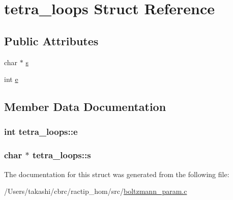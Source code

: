 \hypertarget{structtetra__loops}{\section{tetra\+\_\+loops Struct Reference}
\label{structtetra__loops}
}
\subsection*{Public Attributes}
\begin{DoxyCompactItemize}
\item 
char $\ast$ \hyperlink{structtetra__loops_a5a9ff926aa7eda504b3f011c3eeefe84}{s}
\item 
int \hyperlink{structtetra__loops_a5ab6b25e9a5fd07b656290030ed51da5}{e}
\end{DoxyCompactItemize}


\subsection{Member Data Documentation}
\hypertarget{structtetra__loops_a5ab6b25e9a5fd07b656290030ed51da5}{
\subsubsection[{e}]{\setlength{\rightskip}{0pt plus 5cm}int tetra\+\_\+loops\+::e}}\label{structtetra__loops_a5ab6b25e9a5fd07b656290030ed51da5}
\hypertarget{structtetra__loops_a5a9ff926aa7eda504b3f011c3eeefe84}{
\subsubsection[{s}]{\setlength{\rightskip}{0pt plus 5cm}char $\ast$ tetra\+\_\+loops\+::s}}\label{structtetra__loops_a5a9ff926aa7eda504b3f011c3eeefe84}


The documentation for this struct was generated from the following file\+:\begin{DoxyCompactItemize}
\item 
/\+Users/takashi/cbrc/ractip\+\_\+hom/src/\hyperlink{boltzmann__param_8c}{boltzmann\+\_\+param.\+c}\end{DoxyCompactItemize}
